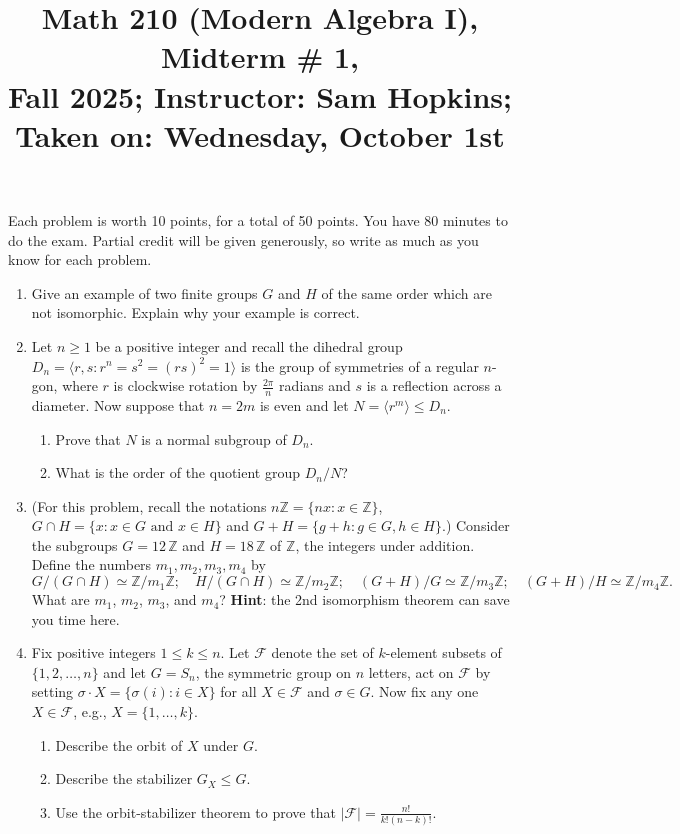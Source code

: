 \documentclass[11pt]{article}
\title{Math 210 (Modern Algebra I), Midterm \# 1, \\ {\normalsize Fall 2025; Instructor: Sam Hopkins; Taken on: Wednesday, October 1st}}
\date{}
\begin{document}
\maketitle

Each problem is worth 10 points, for a total of 50 points. You have 80 minutes to do the exam. Partial credit will be given generously, so write as much as you know for each problem.

\thispagestyle{empty}
\begin{enumerate}

\item Give an example of two finite groups $G$ and $H$ of the same order which are not isomorphic. Explain why your example is correct.

\item Let $n \geq 1$ be a positive integer and recall the dihedral group $D_n = \langle r,s \colon r^n = s^2 = (rs)^2 = 1\rangle$ is the group of symmetries of a regular $n$-gon, where $r$ is clockwise rotation by $\frac{2\pi}{n}$ radians and $s$ is a reflection across a diameter. Now suppose that $n=2m$ is even and let $N = \langle r^m \rangle \leq D_n$.
\begin{enumerate}
\item Prove that $N$ is a normal subgroup of $D_n$.
\item What is the order of the quotient group $D_n/N$?
\end{enumerate}

\item (For this problem, recall the notations $n\mathbb{Z}=\{nx\colon x\in \mathbb{Z}\}$, $G\cap H = \{x\colon x\in G \textrm{ and } x\in H\}$ and $G+H=\{g+h\colon g\in G, h\in H\}$.) Consider the subgroups $G = 12\,\mathbb{Z}$ and $H=18\,\mathbb{Z}$ of $\mathbb{Z}$, the integers under addition. Define the numbers $m_1,m_2,m_3,m_4$ by
\[ G/(G\cap H) \simeq \mathbb{Z}/m_1\mathbb{Z}; \quad H/(G\cap H) \simeq \mathbb{Z}/m_2\mathbb{Z};  \quad (G+H)/G \simeq \mathbb{Z}/m_3\mathbb{Z}; \quad (G+H)/H \simeq \mathbb{Z}/m_4\mathbb{Z}. \]
What are $m_1$, $m_2$, $m_3$, and $m_4$? {\bf Hint}: the 2nd isomorphism theorem can save you time here.

\item Fix positive integers $1 \leq k \leq n$. Let $\mathcal{F}$ denote the set of $k$-element subsets of $\{1,2,\ldots,n\}$ and let $G=S_n$, the symmetric group on $n$ letters, act on $\mathcal{F}$ by setting $\sigma \cdot X = \{\sigma(i)\colon i \in X\}$ for all $X\in \mathcal{F}$ and $\sigma \in G$. Now fix any one $X\in \mathcal{F}$, e.g., $X=\{1,\ldots,k\}$.
\begin{enumerate}
\item Describe the orbit of $X$ under $G$.
\item Describe the stabilizer $G_X \leq G$.
\item Use the orbit-stabilizer theorem to prove that $|\mathcal{F}| = \frac{n!}{k!(n-k)!}$.
\end{enumerate}


\end{enumerate}
\end{document}
